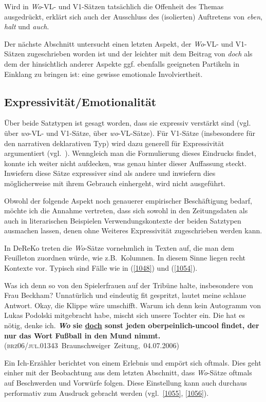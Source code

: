 Wird in \textit{Wo}-VL- und V1-Sätzen tatsächlich die Offenheit des Themas ausgedrückt, erklärt sich auch der Ausschluss des (isolierten) Auftretens von \textit{eben}, \textit{halt} und \textit{auch}.

Der nächste Abschnitt untersucht einen letzten Aspekt, der \textit{Wo}-VL- und V1-Sätzen zugeschrieben worden ist und der leichter mit dem Beitrag von \textit{doch} als dem der hinsichtlich anderer Aspekte ggf. ebenfalls geeigneten Partikeln in Einklang zu bringen ist: eine gewisse emotionale Involviertheit.

\subsection{Expressivität/Emotionalität}
\label{sec:litdoch}
Über beide Satztypen ist gesagt worden, dass sie expressiv verstärkt sind (vgl.\ \citealt[204]{Oppenrieder1989} über \textit{wo}-VL- und V1-Sätze, \citealt[42]{Oppenrieder2013} über \textit{wo}-VL-Sätze). Für V1-Sätze (insbesondere für den narrativen deklarativen Typ) wird dazu generell für Expressivität argumentiert (vgl.\ \citealt[218]{Reis2000}). Wenngleich man die Formulierung dieses Eindrucks findet, konnte ich weiter nicht aufdecken, was genau hinter dieser Auffassung steckt. Inwiefern diese Sätze expressiver  sind als andere und inwiefern dies möglicherweise mit ihrem Gebrauch einhergeht, wird nicht ausgeführt.

Obwohl der folgende Aspekt noch genauerer empirischer Beschäftigung bedarf, möchte ich die Annahme vertreten, dass sich sowohl in den Zeitungsdaten als auch in literarischen Beispielen Verwendungskontexte der beiden Satztypen ausmachen lassen, denen ohne Weiteres Expressivität zugeschrieben werden kann.\largerpage[2]

In DeReKo treten die \textit{Wo}-Sätze vornehmlich in Texten auf, die man dem Feuilleton zuordnen würde, wie z.B.\ Kolumnen. In diesem Sinne liegen recht  Kontexte vor. Typisch sind Fälle wie in (\ref{1048}) und (\ref{1054}).

\begin{exe}
	\ex\label{1054} 

	Was ich denn so von den Spielerfrauen auf der Tribüne halte, insbesondere von Frau Beckham? Unnatürlich und eindeutig fit gespritzt, lautet meine 			schlaue Antwort. Okay, die Klippe wäre umschifft. Warum ich denn kein Autogramm von Lukas Podolski mitgebracht habe, mischt sich unsere Tochter ein. 		Die hat es nötig, denke ich. \textbf{\textit{Wo} sie \ul{doch} sonst jeden oberpeinlich-uncool findet, der nur das Wort Fußball in den Mund 			nimmt.}
	\hfill\hbox{(\textsc{brz06/jul.01343} Braunschweiger Zeitung, 04.07.2006)}
\end{exe}
Ein Ich-Erzähler berichtet von einem Erlebnis und empört sich oftmals. Dies geht einher mit der Beobachtung aus dem letzten Abschnitt, dass \textit{Wo}-Sätze oftmals auf Beschwerden und Vorwürfe folgen. Diese Einstellung kann auch durchaus performativ zum Ausdruck gebracht werden (vgl.\ \ref{1055}, \ref{1056}).

